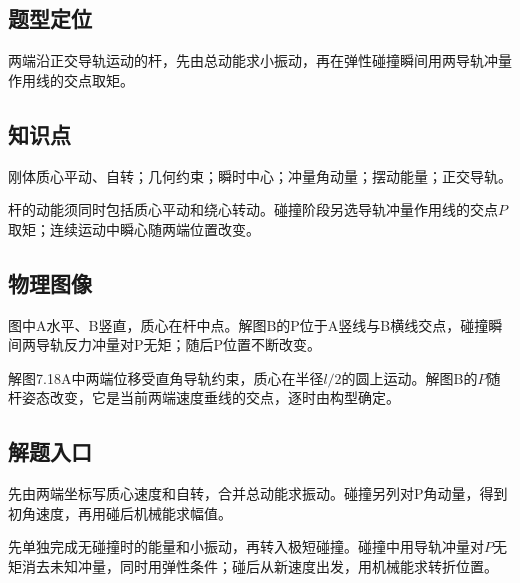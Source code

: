 \documentclass[UTF8,fontset=fandol,a4paper,11pt]{ctexart}
\begin{document}


\subsection*{题型定位}

两端沿正交导轨运动的杆，先由总动能求小振动，再在弹性碰撞瞬间用两导轨冲量作用线的交点取矩。



\subsection*{知识点}

刚体质心平动、自转；几何约束；瞬时中心；冲量角动量；摆动能量；正交导轨。

杆的动能须同时包括质心平动和绕心转动。碰撞阶段另选导轨冲量作用线的交点$P$取矩；连续运动中瞬心随两端位置改变。




\subsection*{物理图像}

图中A水平、B竖直，质心在杆中点。解图B的P位于A竖线与B横线交点，碰撞瞬间两导轨反力冲量对P无矩；随后P位置不断改变。

解图7.18A中两端位移受直角导轨约束，质心在半径$l/2$的圆上运动。解图B的$P$随杆姿态改变，它是当前两端速度垂线的交点，逐时由构型确定。




\subsection*{解题入口}

先由两端坐标写质心速度和自转，合并总动能求振动。碰撞另列对P角动量，得到初角速度，再用碰后机械能求幅值。

先单独完成无碰撞时的能量和小振动，再转入极短碰撞。碰撞中用导轨冲量对$P$无矩消去未知冲量，同时用弹性条件；碰后从新速度出发，用机械能求转折位置。



\end{document}

